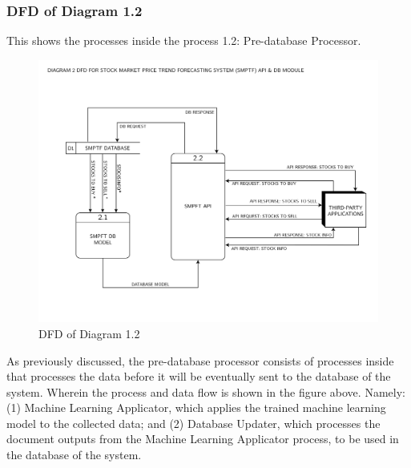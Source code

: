 \subsubsection{DFD of Diagram 1.2}
\label{subsubsec: dfd1.2}
This shows the processes inside the process 1.2: 
Pre-database Processor.
\begin{figure}[ht]
    \centering
    \includegraphics[width=1\textwidth]{./assets/Data Flow Diagram-04.png}
    \caption{DFD of Diagram 1.2}
    \label{fig:dfd1.2}
\end{figure}
\FloatBarrier

As previously discussed, the pre-database processor consists of processes 
inside that processes the data before it will be eventually sent to the database 
of the system. Wherein the process and data flow is shown in the figure above. 
Namely: (1) Machine Learning Applicator, which applies the trained machine learning 
model to the collected data; and 
(2) Database Updater, which processes the document outputs from the Machine 
Learning Applicator process, to be used in the database of the system.


